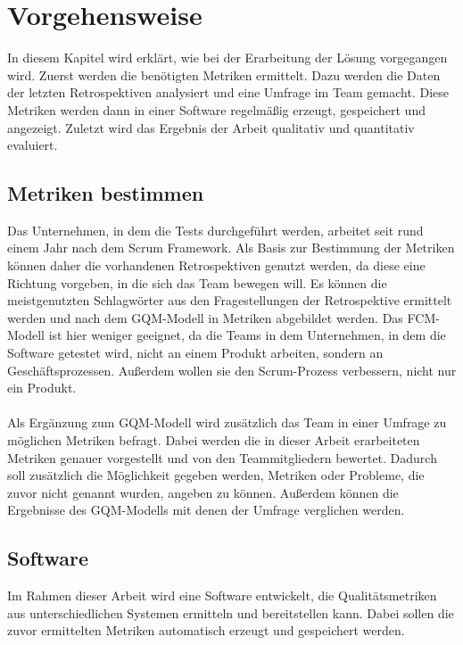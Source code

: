 \chapter{Vorgehensweise}

In diesem Kapitel wird erklärt, wie bei der Erarbeitung der Lösung vorgegangen wird.
Zuerst werden die benötigten Metriken ermittelt.
Dazu werden die Daten der letzten Retrospektiven analysiert und eine Umfrage im Team gemacht.
Diese Metriken werden dann in einer Software regelmäßig erzeugt, gespeichert und angezeigt.
Zuletzt wird das Ergebnis der Arbeit qualitativ und quantitativ evaluiert.

\section{Metriken bestimmen}

Das Unternehmen, in dem die Tests durchgeführt werden, arbeitet seit rund einem Jahr nach dem Scrum Framework.
Als Basis zur Bestimmung der Metriken können daher die vorhandenen Retrospektiven genutzt werden, da diese eine Richtung vorgeben, in die sich das Team bewegen will.
Es können die meistgenutzten Schlagwörter aus den Fragestellungen der Retrospektive ermittelt werden und nach dem \ac{GQM}-Modell in Metriken abgebildet werden.
Das \ac{FCM}-Modell ist hier weniger geeignet, da die Teams in dem Unternehmen, in dem die Software getestet wird, nicht an einem Produkt arbeiten, sondern an Geschäftsprozessen.
Außerdem wollen sie den Scrum-Prozess verbessern, nicht nur ein Produkt.
\\
\\
Als Ergänzung zum \ac{GQM}-Modell wird zusätzlich das Team in einer Umfrage zu möglichen Metriken befragt.
Dabei werden die in dieser Arbeit erarbeiteten Metriken genauer vorgestellt und von den Teammitgliedern bewertet.
Dadurch soll zusätzlich die Möglichkeit gegeben werden, Metriken oder Probleme, die zuvor nicht genannt wurden, angeben zu können.
Außerdem können die Ergebnisse des \ac{GQM}-Modells mit denen der Umfrage verglichen werden.

\clearpage
\section{Software}

Im Rahmen dieser Arbeit wird eine Software entwickelt, die Qualitätsmetriken aus unterschiedlichen Systemen ermitteln und bereitstellen kann.
Dabei sollen die zuvor ermittelten Metriken automatisch erzeugt und gespeichert werden.

